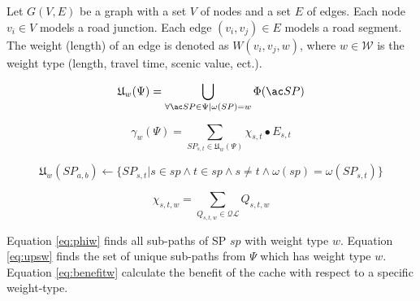 % 
% 
% 
% 
% 
% 
% 
% 
% 
% 

\begin{definition}
Let $G(V, E)$ be a graph with a set $V$ of nodes and a set $E$ of edges.
Each node $v_i \in V$ models a road junction. Each edge $(v_i, v_j) \in
E$ models a road segment. The weight (length) of an edge is denoted as $W(v_i, v_j, w)$, where $w \in \mathcal{W}$ is the weight type (length, travel time, scenic value, ect.).
\end{definition}


\begin{equation} \label{eq:upsw}
 \mathfrak{U}_w(\Psi) = \bigcup\limits_{\forall \spath \in \Psi | \omega(SP) = w} \Phi(\spath)
\end{equation}

\begin{equation} \label{eq:benefitw}
\gamma_w(\Psi) = \sum\limits_{SP_{s,t} \in \mathfrak{U}_w(\Psi)} \chi_{s,t} \bullet E_{s,t}
\end{equation}

\begin{equation} \label{eq:phiw}
\mathfrak{U}_w(SP_{a,b}) \leftarrow \{ SP_{s,t} | s \in sp \wedge t \in sp \wedge s \neq t \wedge \omega(sp) = \omega(SP_{s,t})\}
\end{equation}

\begin{equation} \label{eq:phiw}
\chi_{s,t,w} =  \sum\limits_{Q_{s,t,w} \in \mathcal{QL} } Q_{s,t,w}
\end{equation}



Equation \ref{eq:phiw} finds all sub-paths of SP $sp$ with weight type $w$. 
Equation \ref{eq:upsw} finds the set of unique sub-paths from $\Psi$ which has weight type $w$.
Equation \ref{eq:benefitw} calculate the benefit of the cache with respect to a specific weight-type.

